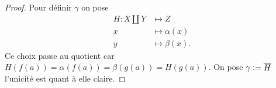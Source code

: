 \documentclass[12pt]{book}
\newcommand{\defeq}{\vcentcolon=}
\theoremstyle{definition}
\theoremstyle{remark}
\begin{document}
	\begin{proof}
		Pour définir $\gamma$ on pose  
		\begin{align*}
			H : X \coprod Y &\longmapsto Z \\
			x &\longmapsto \alpha(x) \\
			y &\longmapsto \beta(x)
		.\end{align*}
		Ce choix passe au quotient car $H(f(a)) = \alpha(f(a)) = \beta(g(a)) = H(g(a))$. On pose  $\gamma \defeq \overline{H}$ l'unicité est quant à elle claire.
	\end{proof}
\end{document}
